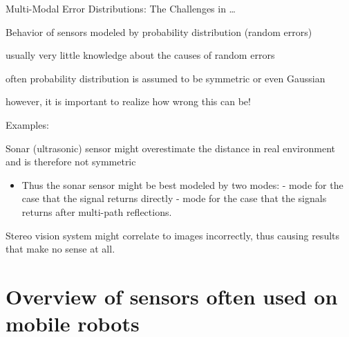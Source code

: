 \documentclass[compress]{beamer}
\begin{document}
\begin{frame}{Multi-Modal Error Distributions: The Challenges in
\ldots{}}

Behavior of sensors modeled by probability distribution (random errors)

usually very little knowledge about the causes of random errors

often probability distribution is assumed to be symmetric or even
Gaussian

however, it is important to realize how wrong this can be!

Examples:

Sonar (ultrasonic) sensor might overestimate the distance in real
environment and is therefore not symmetric

\begin{itemize}

\item
  Thus the sonar sensor might be best modeled by two modes: - mode for
  the case that the signal returns directly - mode for the case that the
  signals returns after multi-path reflections.
\end{itemize}

Stereo vision system might correlate to images incorrectly, thus causing
results that make no sense at all.

\end{frame}

\section[Sensors Overview]{Overview of sensors often used on mobile robots}
\end{document}
